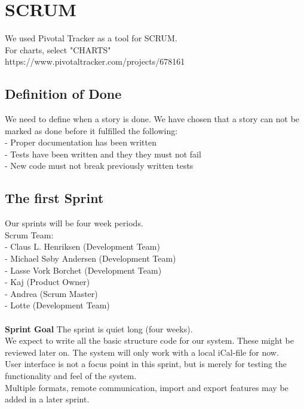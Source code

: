 \section{SCRUM}
We used Pivotal Tracker as a tool for SCRUM.\\
For charts, select "CHARTS"\\
https://www.pivotaltracker.com/projects/678161\\

\subsection{Definition of Done}
We need to define when a story is done. We have chosen that a story can not be
marked as done before it fulfilled the following: \\
- Proper documentation has been written\\
- Tests have been written and they they must not fail\\
- New code must not break previously written tests\\

\subsection{The first Sprint}
Our sprints will be four week periods.\\
Scrum Team:\\
- Claus L. Henriksen (Development Team)\\
- Michael Søby Andersen (Development Team)\\
- Lasse Vork Borchet (Development Team)\\
- Kaj (Product Owner)\\
- Andrea (Scrum Master)\\
- Lotte (Development Team)\\
\\
\textbf{Sprint Goal}
The sprint is quiet long (four weeks).\\
We expect to write all the basic structure code for our system. These might be reviewed later on. The system will only work with a local iCal-file for now. \\
User interface is not a focus point in this sprint, but is merely for testing the functionality and feel of the system.\\
Multiple formats, remote communication, import and export features may be added in a later sprint.\\

